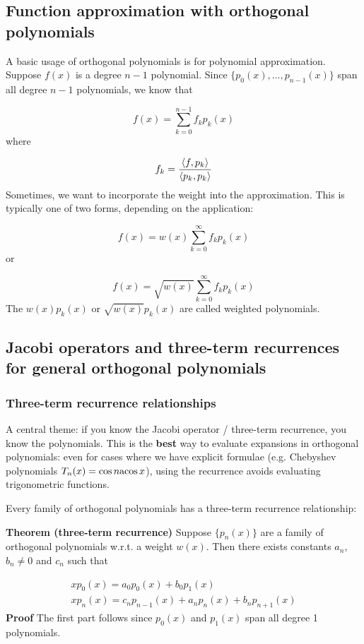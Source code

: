 \documentclass[12pt,a4paper]{article}
\def\acos{ {\rm acos}\, }
\def\ip<#1>{\left\langle{#1}\right\rangle}
\begin{document}
\subsection{Function approximation with orthogonal polynomials}
A basic usage of orthogonal polynomials is for polynomial approximation. Suppose $f(x)$ is a degree $n-1$ polynomial. Since $\{p_0(x),\ldots,p_{n-1}(x)\}$ span all degree $n-1$ polynomials, we know that

\[
f(x) = \sum_{k=0}^{n-1} f_k p_k(x)
\]
where

\[
f_k = {\ip<f, p_k> \over \ip<p_k,p_k>}
\]
Sometimes, we want to incorporate the weight into the approximation. This is typically one of two forms, depending on the application:

\[
f(x) = w(x) \sum_{k=0}^\infty f_k p_k(x)
\]
or

\[
        f(x) = \sqrt{w(x)} \sum_{k=0}^\infty f_k p_k(x)
\]
The $w(x)p_k(x)$ or $\sqrt{w(x)}p_k(x)$ are called weighted polynomials.

\subsection{Jacobi operators and three-term recurrences for general orthogonal polynomials}
\subsubsection{Three-term recurrence relationships}
A central theme: if you know the Jacobi operator / three-term recurrence, you know the polynomials. This is the \textbf{best} way to evaluate expansions in orthogonal polynomials: even for cases where we have explicit formulae (e.g. Chebyshev polynomials $T_n(x) = \cos n \acos x$), using the recurrence avoids evaluating trigonometric functions.

Every family of orthogonal polynomials has a three-term recurrence relationship:

\textbf{Theorem (three-term recurrence)} Suppose $\{p_n(x)\}$ are a family of orthogonal polynomials w.r.t. a weight $w(x)$. Then there exists constants $a_n$, $b_n \neq 0$ and $c_n$ such that


\begin{align*}
x p_0(x) = a_0 p_0(x) + b_0 p_1(x) \\
x p_n(x) = c_n p_{n-1}(x) + a_n p_n(x) + b_n p_{n+1}(x)
\end{align*}
\textbf{Proof} The first part follows since $p_0(x)$ and $p_1(x)$ span all degree 1 polynomials.
\end{document}
